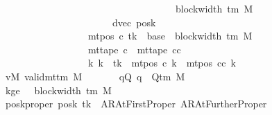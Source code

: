 \begin{isabellebody}
\ \ \ \ \ \ \ \ \ \ \ \ \ \ \ \ \ \ \ \ \ \ \ \ \ \ \ \ \ \ \ \ \ \ \ \ \ \ \ \ \ \ {\isacharbrackleft}{\kern0pt}{}{\isachardot}{\kern0pt}{\isachardot}{\kern0pt}{\isacharless}{\kern0pt}block{\isacharunderscore}{\kern0pt}width\ {\isacharparenleft}{\kern0pt}{\isasymGamma}{\isacharunderscore}{\kern0pt}tm\ M{\isacharparenright}{\kern0pt}\ {\isacharminus}{\kern0pt}\ {}{\isacharbrackright}{\kern0pt}{\isacharparenright}{\kern0pt}{\isacharparenright}{\kern0pt}{\isacharcomma}{\kern0pt}\isanewline
\ \ \ \ \ \ \ \ \ \ \ \ \ \ \ \ \ \ \ \ \ \ \ \ \ \ \ \ \ dvec{\isacharcomma}{\kern0pt}\ posk{\isacharprime}{\kern0pt}{\isacharparenright}{\kern0pt}\isanewline
\ \ \ \ \ \ \ \ \ \ \ \ \ \ \ \ \ \ \ \ \ \ \ {\isasymand}\ mt{\isacharunderscore}{\kern0pt}pos\ c{\isacharprime}{\kern0pt}{\isacharprime}{\kern0pt}\ tk\ {\isacharequal}{\kern0pt}\ base{\isacharprime}{\kern0pt}\ {\isacharplus}{\kern0pt}\ {\isacharparenleft}{\kern0pt}block{\isacharunderscore}{\kern0pt}width\ {\isacharparenleft}{\kern0pt}{\isasymGamma}{\isacharunderscore}{\kern0pt}tm\ M{\isacharparenright}{\kern0pt}\ {\isacharminus}{\kern0pt}\ {}{\isacharparenright}{\kern0pt}\isanewline
\ \ \ \ \ \ \ \ \ \ \ \ \ \ \ \ \ \ \ \ \ \ \ {\isasymand}\ mt{\isacharunderscore}{\kern0pt}tape\ c{\isacharprime}{\kern0pt}{\isacharprime}{\kern0pt}\ {\isacharequal}{\kern0pt}\ mt{\isacharunderscore}{\kern0pt}tape\ cc\isanewline
\ \ \ \ \ \ \ \ \ \ \ \ \ \ \ \ \ \ \ \ \ \ \ {\isasymand}\ {\isacharparenleft}{\kern0pt}{\isasymforall}k{\isacharprime}{\kern0pt}{\isachardot}{\kern0pt}\ k{\isacharprime}{\kern0pt}\ {\isasymnoteq}\ tk\ {\isasymlongrightarrow}\ mt{\isacharunderscore}{\kern0pt}pos\ c{\isacharprime}{\kern0pt}{\isacharprime}{\kern0pt}\ k{\isacharprime}{\kern0pt}\ {\isacharequal}{\kern0pt}\ mt{\isacharunderscore}{\kern0pt}pos\ cc\ k{\isacharprime}{\kern0pt}{\isacharparenright}{\kern0pt}{\isachardoublequoteclose}\isanewline
\ \ \ \ \ \ \ vM{\isacharcolon}{\kern0pt}\ {\isachardoublequoteopen}valid{\isacharunderscore}{\kern0pt}mttm\ M{\isachardoublequoteclose}\isanewline
\ \ \ \ \ \ \ qQ{\isacharcolon}{\kern0pt}\ {\isachardoublequoteopen}q\ {\isasymin}\ Q{\isacharunderscore}{\kern0pt}tm\ M{\isachardoublequoteclose}\isanewline
\ \ \ \ \ \ \ kge{}{\isacharcolon}{\kern0pt}\ {\isachardoublequoteopen}{}\ {\isasymle}\ block{\isacharunderscore}{\kern0pt}width\ {\isacharparenleft}{\kern0pt}{\isasymGamma}{\isacharunderscore}{\kern0pt}tm\ M{\isacharparenright}{\kern0pt}{\isachardoublequoteclose}\isanewline
\ \ \ \ \ \ \ posk{\isacharunderscore}{\kern0pt}proper{\isacharcolon}{\kern0pt}\ {\isachardoublequoteopen}posk\ tk\ {\isasymin}\ {\isacharbraceleft}{\kern0pt}AR{\isacharunderscore}{\kern0pt}AtFirstProper{\isacharcomma}{\kern0pt}\ AR{\isacharunderscore}{\kern0pt}AtFurtherProper{\isacharbraceright}{\kern0pt}{\isachardoublequoteclose}\isanewline

\end{isabellebody}
